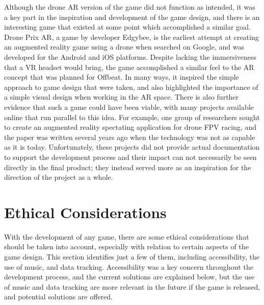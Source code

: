 \documentclass[10pt,twocolumn]{article}
\begin{document}
Although the drone AR version of the game did not function as intended, it was a key part in the inspiration and development of the game design, and there is an interesting game that existed at some point which accomplished a similar goal. Drone Prix AR\cite{DronePrixAR}, a game by developer Edgybee, is the earliest attempt at creating an augmented reality game using a drone when searched on Google, and was developed for the Android and iOS platforms. Despite lacking the immersiveness that a VR headset would bring, the game accomplished a similar feel to the AR concept that was planned for Offbeat. In many ways, it inspired the simple approach to game design that were taken, and also highlighted the importance of a simple visual design when working in the AR space. There is also further evidence that such a game could have been viable, with many projects available online that run parallel to this idea. For example, one group of researchers\cite{DroneARFPVReport} sought to create an augmented reality spectating application for drone FPV racing, and the paper was written several years ago when the technology was not as capable as it is today. Unfortunately, these projects did not provide actual documentation to support the development process and their impact can not necessarily be seen directly in the final product; they instead served more as an inspiration for the direction of the project as a whole.

\section{Ethical Considerations}
With the development of any game, there are some ethical considerations that should be taken into account, especially with relation to certain aspects of the game design. This section identifies just a few of them, including accessibility, the use of music, and data tracking. Accessibility was a key concern throughout the development process, and the current solutions are explained below, but the use of music and data tracking are more relevant in the future if the game is released, and potential solutions are offered.
\end{document}
